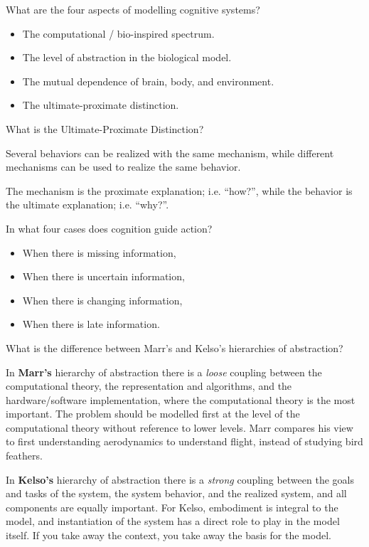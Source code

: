 
\begin{flashcard}[Question]{What are the four aspects of modelling cognitive systems?}
\begin{itemize}
\item The computational / bio-inspired spectrum.
\item The level of abstraction in the biological model.
\item The mutual dependence of brain, body, and environment.
\item The ultimate-proximate distinction.
\end{itemize}
\end{flashcard}

\begin{flashcard}[Question]{What is the Ultimate-Proximate Distinction?}
\begin{center}
Several behaviors can be realized with the same mechanism, while different mechanisms can be used to realize the same behavior.

\medskip

The mechanism is the proximate explanation; i.e. ``how?'', while the behavior is the ultimate explanation; i.e. ``why?''.
\end{center}
\end{flashcard}

\begin{flashcard}[Question]{In what four cases does cognition guide action?}
\begin{itemize}
\item When there is missing information,
\item When there is uncertain information,
\item When there is changing information,
\item When there is late information.
\end{itemize}
\end{flashcard}

\begin{flashcard}[Question]{What is the difference between Marr's and Kelso's hierarchies of abstraction?}
\begin{center}
In \textbf{Marr's} hierarchy of abstraction there is a \textit{loose} coupling between the computational theory, the representation and algorithms, and the hardware/software implementation, where the computational theory is the most important. The problem should be modelled first at the level of the computational theory without reference to lower levels. Marr compares his view to first understanding aerodynamics to understand flight, instead of studying bird feathers.

\medskip

In \textbf{Kelso's} hierarchy of abstraction there is a \textit{strong} coupling between the goals and tasks of the system, the system behavior, and the realized system, and all components are equally important. For Kelso, embodiment is integral to the model, and instantiation of the system has a direct role to play in the model itself. If you take away the context, you take away the basis for the model.
\end{center}
\end{flashcard}

